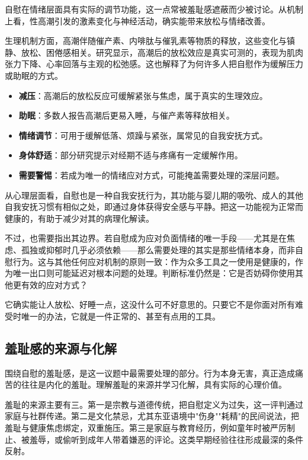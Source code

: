 \documentclass[12pt,UTF8]{ctexbook}
\newcommand{\keyword}[1]{\textbf{#1}}
\begin{document}
自慰在情绪层面具有实际的调节功能，这一点常被羞耻感遮蔽而少被讨论。从机制上看，性高潮引发的激素变化与神经活动，确实能带来放松与情绪改善。

生理机制方面，高潮伴随催产素、内啡肽与催乳素等物质的释放，这些变化与镇静、放松、困倦感相关。研究显示，高潮后的放松效应是真实可测的，表现为肌肉张力下降、心率回落与主观的松弛感。这也解释了为何许多人把自慰作为缓解压力或助眠的方式。

\begin{itemize}
	\item \keyword{减压}：高潮后的放松反应可缓解紧张与焦虑，属于真实的生理效应。
	\item \keyword{助眠}：多数人报告高潮后更易入睡，与催产素等释放相关。
	\item \keyword{情绪调节}：可用于缓解低落、烦躁与紧张，属常见的自我安抚方式。
	\item \keyword{身体舒适}：部分研究提示对经期不适与疼痛有一定缓解作用。
	\item \keyword{需要警惕}：若成为唯一的情绪应对方式，可能掩盖需要处理的深层问题。
\end{itemize}

从心理层面看，自慰也是一种自我安抚行为，其功能与婴儿期的吸吮、成人的其他自我安抚习惯有相似之处，即通过身体获得安全感与平静。把这一功能视为正常而健康的，有助于减少对其的病理化解读。

不过，也需要指出其边界。若自慰成为应对负面情绪的唯一手段——尤其是在焦虑、孤独或抑郁时几乎必须依赖——那么需要处理的其实是那些情绪本身，而非自慰行为。这与其他任何应对机制的原则一致：作为众多工具之一使用是健康的，作为唯一出口则可能延迟对根本问题的处理。判断标准仍然是：它是否妨碍你使用其他更有效的应对方式？

\begin{tcolorbox}[colback=pink!5!white,colframe=red!50!black,title=贴心小叮咛]
	它确实能让人放松、好睡一点，这没什么可不好意思的。只要它不是你面对所有难受时唯一的办法，它就是一件正常的、甚至有点用的工具。
\end{tcolorbox}
\subsection{羞耻感的来源与化解}

围绕自慰的羞耻感，是这一议题中最需要处理的部分。行为本身无害，真正造成痛苦的往往是内化的羞耻。理解羞耻的来源并学习化解，具有实际的心理价值。

羞耻的来源主要有三。第一是宗教与道德传统，把自慰定义为过失，这一评判通过家庭与社群传递。第二是文化禁忌，尤其东亚语境中"伤身""耗精"的民间说法，把羞耻与健康焦虑绑定，双重施压。第三是家庭与教育经历，例如童年时被严厉制止、被羞辱，或偷听到成年人带着嫌恶的评论。这类早期经验往往形成最深的条件反射。
\end{document}
